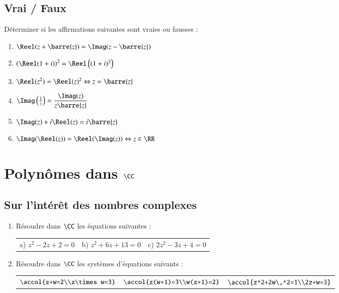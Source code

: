 \documentclass[oneside,12pt]{article}          %
\begin{document}
\subsection{Vrai / Faux}
Déterminer si les affirmations suivantes sont vraies ou fausses :
\begin{enumerate}\setlength{\itemsep}{0.5mm}
	\item $\Reel(z+\barre{z})=\Imag(z-\barre{z})$
    \item $\left(\Reel(1+i)\right)^2=\Reel\left((1+i)^2\right)$
    \item $\Reel(z^2)=\Reel(z)^2 \Leftrightarrow z=\barre{z}$
    \item $\Imag\left(\frac{1}{z}\right)=\dfrac{\Imag(z)}{z\barre{z}}$
    \item $\Imag(z)+i\Reel(z)=i\barre{z}$
    \item $\Imag(\Reel(z))=\Reel(\Imag(z)) \Leftrightarrow z\in\RR$
\end{enumerate}



\section{Polynômes dans $\CC$}

\subsection{Sur l'intérêt des nombres complexes}
\begin{enumerate}
    \item  Résoudre dans $\CC$ les équations suivantes :
    
    \begin{tabular}{p{} p{} p{}}
        a) $z^2-2z+2=0$ & b) $z^2+6z+13=0$ & c) $2z^2-3z+4=0$
    \end{tabular}

    \item Résoudre dans $\CC$ les systèmes d'équations suivants :

    \renewcommand{\arraystretch}{1}
    \begin{tabular}{p{} p{} p{}}
        $\accol{z+w=2\\z\times w=3}$ & $\accol{z(w+1)=3\\w(z+1)=2}$ & $\accol{z^2+2w\,^2=1\\2z+w=3}$ 
    \end{tabular}
\end{enumerate}
\end{document}
